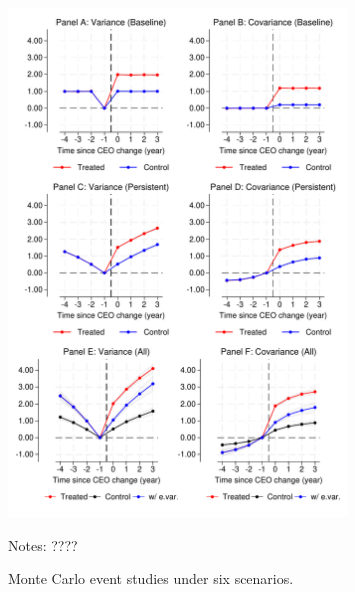 \documentclass[11pt,a4paper]{article}
\begin{document}
\begin{figure}[htbp]
\centering
\includegraphics[width=0.8\textwidth]{figure/figuremc.pdf}
\caption{Monte Carlo event studies under six scenarios.} \label{fig:mc}
\vspace{.2cm}

\begin{minipage}{0.9\textwidth}
\footnotesize Notes: ????
\end{minipage}
\end{figure}
\end{document}
